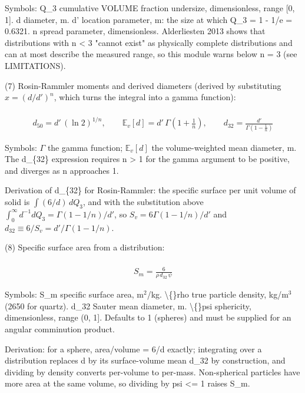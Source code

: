 \documentclass[10pt,a4paper,twoside]{report}
\begin{document}
Symbols: Q\_3      cumulative VOLUME fraction undersize, dimensionless, range [0, 1]. d        diameter, m. d'       location parameter, m: the size at which Q\_3 = 1 - 1/e = 0.6321. n        spread parameter, dimensionless. Alderliesten 2013 shows that distributions with n < 3 "cannot exist" as physically complete distributions and can at most describe the measured range, so this module warns below n = 3 (see LIMITATIONS).

(7) Rosin-Rammler moments and derived diameters (derived by substituting $x = (d/d')^n$, which turns the integral into a gamma function):

\begin{equation*}
\begin{gathered}
\\ d_{50} = d'\,(\ln 2)^{1/n}, \qquad \mathbb{E}_v[d] = d'\,\Gamma\!\left(1 + \tfrac{1}{n}\right), \qquad d_{32} = \frac{d'}{\Gamma\!\left(1 - \tfrac{1}{n}\right)}
\end{gathered}
\end{equation*}

Symbols: $\Gamma$ the gamma function; $\mathbb{E}_v[d]$ the volume-weighted mean diameter, m. The d\_\{32\} expression requires n > 1 for the gamma argument to be positive, and diverges as n approaches 1.

Derivation of d\_\{32\} for Rosin-Rammler: the specific surface per unit volume of solid is $\int (6/d)\,dQ_3$, and with the substitution above $\int_0^\infty d^{-1} dQ_3 = \Gamma(1 - 1/n)/d'$, so $S_v = 6\Gamma(1-1/n)/d'$ and $d_{32} \equiv 6/S_v = d'/\Gamma(1-1/n)$.

(8) Specific surface area from a distribution:

\begin{equation*}
\begin{gathered}
\\ S_m = \frac{6}{\rho\,d_{32}\,\psi}
\end{gathered}
\end{equation*}

Symbols: S\_m   specific surface area, m$^{2}$/kg. \textbackslash\{\}rho  true particle density, kg/m$^{3}$ (2650 for quartz). d\_32  Sauter mean diameter, m. \textbackslash\{\}psi  sphericity, dimensionless, range (0, 1]. Defaults to 1 (spheres) and must be supplied for an angular comminution product.

\begin{verbatimsmall}
Derivation: for a sphere, area/volume = 6/d exactly; integrating over a distribution
replaces d by its surface-volume mean d_32 by construction, and dividing by density
converts per-volume to per-mass. Non-spherical particles have more area at the same
volume, so dividing by psi <= 1 raises S_m.
\end{verbatimsmall}
\end{document}
